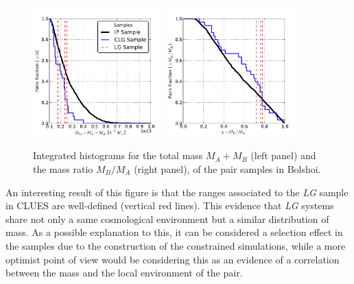 \begin{figure}[htbp]
	\centering
	\includegraphics[trim = 0mm 0mm 9.5mm 10mm, clip, width=0.45\textwidth]
	{./figures/4_results/IP_IMF.pdf}
	\includegraphics[trim = 0mm 0mm 9.5mm 10mm, clip, width=0.45\textwidth]
	{./figures/4_results/IP_Mass_Ratio.pdf}
	
	\caption{\small{ Integrated histograms for the total mass $M_{A} + 
	M_{B}$ (left panel) and the mass ratio $M_B/M_A$ (right panel), of the
	pair samples in Bolshoi. }}
	\label{fig:CLG_Mass}
\end{figure}


An interesting result of this figure is that the ranges associated to the
\textit{LG} sample in CLUES are well-defined (vertical red lines). This 
evidence that \textit{LG} systems share not only a same cosmological 
environment but a similar distribution of mass. As a possible explanation 
to this, it can be considered a selection effect in the samples due to the
construction of the constrained simulations, while a more optimist point 
of view would be considering this as an evidence of a correlation between
the mass and the local environment of the pair.


